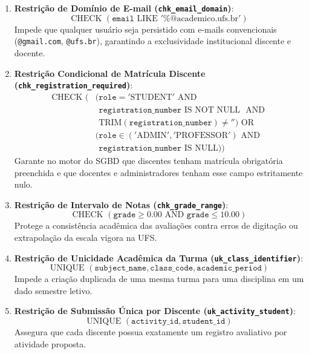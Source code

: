\begin{enumerate}
    \item \textbf{Restrição de Domínio de E-mail (\texttt{chk\_email\_domain})}:
    \begin{equation}
        \text{CHECK } (\texttt{email} \text{ LIKE } '\%\text{@academico.ufs.br}')
    \end{equation}
    Impede que qualquer usuário seja persistido com e-mails convencionais (\texttt{@gmail.com}, \texttt{@ufs.br}), garantindo a exclusividade institucional discente e docente.

    \item \textbf{Restrição Condicional de Matrícula Discente (\texttt{chk\_registration\_required})}:
    \begin{align}
        \text{CHECK } ( & (\texttt{role} = '\text{STUDENT}' \text{ AND } \nonumber \\
        & \phantom{(} \texttt{registration\_number} \text{ IS NOT NULL } \text{ AND } \nonumber \\
        & \phantom{(} \text{TRIM}(\texttt{registration\_number}) \neq '') \text{ OR } \nonumber \\
        & (\texttt{role} \in ('\text{ADMIN}', '\text{PROFESSOR}') \text{ AND } \nonumber \\
        & \phantom{(} \texttt{registration\_number} \text{ IS NULL}) )
    \end{align}
    Garante no motor do SGBD que discentes tenham matrícula obrigatória preenchida e que docentes e administradores tenham esse campo estritamente nulo.

    \item \textbf{Restrição de Intervalo de Notas (\texttt{chk\_grade\_range})}:
    \begin{equation}
        \text{CHECK } (\texttt{grade} \ge 0.00 \text{ AND } \texttt{grade} \le 10.00)
    \end{equation}
    Protege a consistência acadêmica das avaliações contra erros de digitação ou extrapolação da escala vigora na UFS.

    \item \textbf{Restrição de Unicidade Acadêmica da Turma (\texttt{uk\_class\_identifier})}:
    \begin{equation}
        \text{UNIQUE } (\texttt{subject\_name}, \texttt{class\_code}, \texttt{academic\_period})
    \end{equation}
    Impede a criação duplicada de uma mesma turma para uma disciplina em um dado semestre letivo.

    \item \textbf{Restrição de Submissão Única por Discente (\texttt{uk\_activity\_student})}:
    \begin{equation}
        \text{UNIQUE } (\texttt{activity\_id}, \texttt{student\_id})
    \end{equation}
    Assegura que cada discente possua exatamente um registro avaliativo por atividade proposta.
\end{enumerate}
